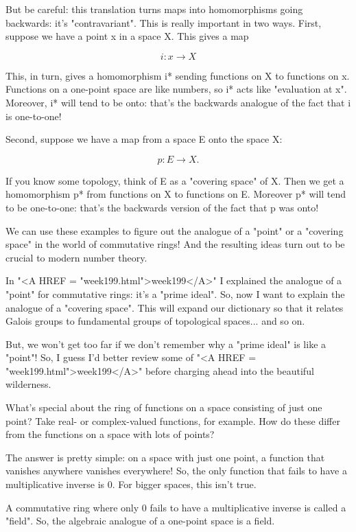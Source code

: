 But be careful: this translation turns maps into homomorphisms going
backwards: it's "contravariant".  This is really important in two 
ways. 
First, suppose we have a point x in a space X.  This gives a map

$$
i: {x} \to  X
$$
    
This, in turn, gives a homomorphism i* sending functions on X to 
functions on {x}.  Functions on a one-point space are like numbers, 
so i* acts like "evaluation at x".   Moreover, i* will tend to be 
onto: that's the backwards analogue of the fact that i is one-to-one!

Second, suppose we have a map from a space E onto the space X: 

$$
p: E \to  X.
$$
    
If you know some topology, think of E as a "covering space" of X.  
Then 
we get a homomorphism p* from functions on X to functions on E.  Moreover
p* will tend to be one-to-one: that's the backwards version of the fact 
that p was onto!

We can use these examples to figure out the analogue of a "point" or a 
"covering space" in the world of commutative rings!  And the resulting
ideas turn out to be crucial to modern number theory.  

In "<A HREF = "week199.html">week199</A>" I explained the analogue of a "point" for commutative rings: 
it's a "prime ideal".  So, now I want to explain the analogue of a
"covering space".  This will expand our dictionary so that it relates 
Galois groups to fundamental groups of topological spaces... and so on.  

But, we won't get too far if we don't remember why a "prime ideal" is
like a "point"!  So, I guess I'd better review some of "<A HREF = "week199.html">week199</A>" before 
charging ahead into the beautiful wilderness.

What's special about the ring of functions on a space consisting of 
just one point?   Take real- or complex-valued functions, for example.
How do these differ from the functions on a space with lots of points?

The answer is pretty simple: on a space with just one point, a function
that vanishes anywhere vanishes everywhere!  So, the only function
that fails to have a multiplicative inverse is 0.  For bigger spaces,
this isn't true.

A commutative ring where only 0 fails to have a multiplicative inverse
is called a "field".  So, the algebraic analogue of a one-point 
space is a field. 

